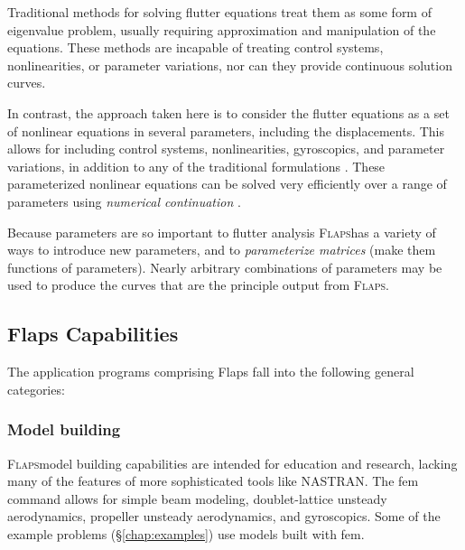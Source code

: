 \documentclass[11pt,openany,twoside]{book}
\numberwithin{equation}{section}		%
\newcommand{\Cmd}[1]{{\sf #1}}
\newcommand{\Newterm}[1]{{\em #1}}	%
\newcommand{\Flaps}{\textsc{Flaps\:}}
\newcommand{\Nastran}{{\footnotesize{NASTRAN\:}}}
\newcommand{\Sectref}[1]{\S\ref{#1}}
\begin{document}
Traditional methods for solving flutter equations treat them as
some form of eigenvalue problem, usually requiring approximation and
manipulation of the equations. These methods are incapable of treating
control systems, nonlinearities, or parameter variations, nor can they
provide continuous solution curves.

In contrast, the approach taken here is to consider the flutter equations as a
set of nonlinear equations in several parameters, including the displacements.
This allows for including control systems, nonlinearities, gyroscopics,
and parameter variations, in addition to any of the traditional
formulations \cite{demasi2024introduction}.
These parameterized nonlinear equations can be solved very efficiently
over a range of parameters using \Newterm{numerical continuation}
\cite{allgower1990numerical}.

Because parameters are so important to flutter analysis \Flaps has
a variety of ways to introduce new parameters, and to
\Newterm{parameterize matrices} (make them functions of parameters).
Nearly arbitrary combinations of parameters may be used to produce
the curves that are the principle output from \Flaps.


\subsection{Flaps Capabilities}
The application programs comprising Flaps fall into the following
general categories:

\subsubsection{Model building}
\Flaps model building capabilities are intended for education
and research, lacking many of the features of more sophisticated
tools like \Nastran.
The \Cmd{fem} command allows for simple beam modeling,
doublet-lattice unsteady aerodynamics, propeller unsteady
aerodynamics, and gyroscopics. Some of the example problems (\Sectref{chap:examples})
use models built with \Cmd{fem}.
\end{document}
